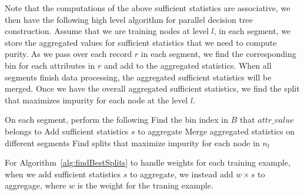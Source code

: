 Note that the computations of the above sufficient statistics are associative,
we then have the following high level algorithm for parallel decision tree
construction. Assume that we are training nodes at level $l$, in each segment,
we store the aggregated values for sufficient statistics that we need to compute
purity. As we pass over each record $r$ in each segment, we find the
corresponding bin for each attributes in $r$ and add to the aggregated
statistics. When all segments finish data processing, the aggregated
sufficient statistics will be merged. Once we have the overall aggregated
sufficient statistics, we find the split that maximizes impurity for each node
at the level $l$.

\begin{algorithm}[findBestSplits$(D^*, M, n_l, B)$] \label{alg:findBestSplits}
\begin{algorithmic}[1]
    \State On each segment, perform the following 
            \State Find the bin index in $B$ that $attr\_value$ belongs to
            \State Add sufficient statistics $s$ to aggregate
        \EndFor
    \EndFor
    \State Merge aggregated statistics on different segments 
    \State Find splits that maximize impurity for each node in $n_l$ 
\end{algorithmic}
\end{algorithm}
For Algorithm~\ref{alg:findBestSplits} to handle weights for each training example, when we add sufficient statistics $s$ to aggregate,
we instead add $w \times s$ to aggregage, where $w$ is the weight for the traning example.

